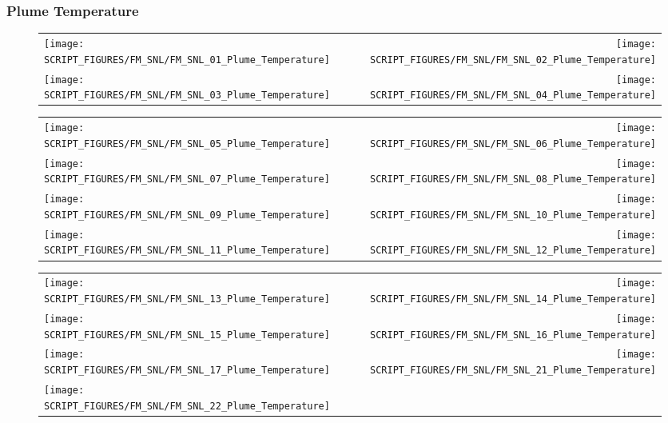 \clearpage

\subsubsection{Plume Temperature}

\begin{figure}[!ht]
\begin{tabular*}{\textwidth}{l@{\extracolsep{\fill}}r}
\texttt{[image: SCRIPT\_FIGURES/FM\_SNL/FM\_SNL\_01\_Plume\_Temperature]} &
\texttt{[image: SCRIPT\_FIGURES/FM\_SNL/FM\_SNL\_02\_Plume\_Temperature]} \\
\texttt{[image: SCRIPT\_FIGURES/FM\_SNL/FM\_SNL\_03\_Plume\_Temperature]} &
\texttt{[image: SCRIPT\_FIGURES/FM\_SNL/FM\_SNL\_04\_Plume\_Temperature]}
\end{tabular*}
\label{FM_SNL_Plume_1}
\end{figure}

\newpage

\begin{figure}[!ht]
\begin{tabular*}{\textwidth}{l@{\extracolsep{\fill}}r}
\texttt{[image: SCRIPT\_FIGURES/FM\_SNL/FM\_SNL\_05\_Plume\_Temperature]} &
\texttt{[image: SCRIPT\_FIGURES/FM\_SNL/FM\_SNL\_06\_Plume\_Temperature]} \\
\texttt{[image: SCRIPT\_FIGURES/FM\_SNL/FM\_SNL\_07\_Plume\_Temperature]} &
\texttt{[image: SCRIPT\_FIGURES/FM\_SNL/FM\_SNL\_08\_Plume\_Temperature]} \\
\texttt{[image: SCRIPT\_FIGURES/FM\_SNL/FM\_SNL\_09\_Plume\_Temperature]} &
\texttt{[image: SCRIPT\_FIGURES/FM\_SNL/FM\_SNL\_10\_Plume\_Temperature]} \\
\texttt{[image: SCRIPT\_FIGURES/FM\_SNL/FM\_SNL\_11\_Plume\_Temperature]} &
\texttt{[image: SCRIPT\_FIGURES/FM\_SNL/FM\_SNL\_12\_Plume\_Temperature]}
\end{tabular*}
\label{FM_SNL_Plume_2}
\end{figure}

\begin{figure}[!ht]
\begin{tabular*}{\textwidth}{l@{\extracolsep{\fill}}r}
\texttt{[image: SCRIPT\_FIGURES/FM\_SNL/FM\_SNL\_13\_Plume\_Temperature]} &
\texttt{[image: SCRIPT\_FIGURES/FM\_SNL/FM\_SNL\_14\_Plume\_Temperature]} \\
\texttt{[image: SCRIPT\_FIGURES/FM\_SNL/FM\_SNL\_15\_Plume\_Temperature]} &
\texttt{[image: SCRIPT\_FIGURES/FM\_SNL/FM\_SNL\_16\_Plume\_Temperature]} \\
\texttt{[image: SCRIPT\_FIGURES/FM\_SNL/FM\_SNL\_17\_Plume\_Temperature]} &
\texttt{[image: SCRIPT\_FIGURES/FM\_SNL/FM\_SNL\_21\_Plume\_Temperature]} \\
\texttt{[image: SCRIPT\_FIGURES/FM\_SNL/FM\_SNL\_22\_Plume\_Temperature]} &

\end{tabular*}
\label{FM_SNL_Plume_3}
\end{figure}

